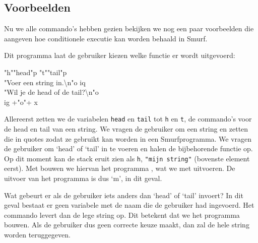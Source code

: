 \subsection{Voorbeelden}
\label{sec:intro:exmp}
Nu we alle commando's hebben gezien bekijken we nog een paar voorbeelden die
aangeven hoe conditionele executie kan worden behaald in Smurf.

%
%

\begin{exmp}
	Dit programma laat de gebruiker kiezen welke functie er wordt uitgevoerd:
	\begin{smurf}
		"h""head"p "t""tail"p \\
		"Voer een string in.\textbackslash{}n"o iq \\
		"Wil je de head of de tail?\textbackslash{}n"o \\
		ig +"o"+ x
	\end{smurf}
	Allereerst zetten we de variabelen \verb$head$ en \verb$tail$ tot \verb$h$ en
	\verb$t$, de commando's voor de head en tail van een string. We vragen de
	gebruiker om een string en zetten die in quotes zodat ze gebruikt kan worden
	in een Smurfprogramma. We vragen de gebruiker om `head' of `tail' in te
	voeren en halen de bijbehorende functie op. Op dit moment kan de stack eruit
	zien als \verb$h$, \verb$"mijn string"$ (bovenste element eerst). Met
	 bouwen we hiervan het programma , wat we met  uitvoeren. De uitvoer van het
	programma is dus `m', in dit geval.

	Wat gebeurt er als de gebruiker iets anders dan `head' of `tail' invoert? In
	dit geval bestaat er geen variabele met de naam die de gebruiker had
	ingevoerd. Het commando  levert dan de lege string op. Dit
	betekent dat we het programma  bouwen. Als de
	gebruiker dus geen correcte keuze maakt, dan zal de hele string worden
	teruggegeven.
\end{exmp}

